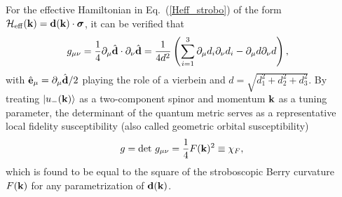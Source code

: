 \documentclass[aps,prb,twocolumn,superscriptaddress,groupedaddress]{revtex4}
\begin{document}
For the effective Hamiltonian in Eq.~(\ref{Heff_strobo}) of the form ${\cal H}_{\rm eff}({\bf k})={\bf d}({\bf k})\cdot{\boldsymbol\sigma}$, it can be verified that\cite{Panahiyan20}
\begin{eqnarray}
g_{\mu\nu}=\frac{1}{4}\partial_{\mu}\hat{\bf d}\cdot\partial_{\nu}\hat{\bf d}
=\frac{1}{4d^{2}}\left(\sum_{i=1}^{3}\partial_{\mu}d_{i}\partial_{\nu}d_{i}-\partial_{\mu}d \partial_{\nu} d \right),\;\;\;
\end{eqnarray}
with ${\hat{\bf e}}_{\mu}=\partial_{\mu}\hat{\bf d}/2$ playing the role of a vierbein and $d=\sqrt{d_1^2+d_2^2+d_3^2}$.
By treating $|u_{-}({\bf k})\rangle$ as a two-component spinor and momentum ${\bf k}$ as a tuning parameter, the determinant of the quantum metric serves as a representative local fidelity susceptibility\cite{You07,Zanardi07,Gu08,Gu10,Kolodrubetz17} (also called geometric orbital susceptibility\cite{Piechon16})
%
\begin{eqnarray}
g=\det\,g_{\mu\nu}=\frac{1}{4}F({\bf k})^{2}\equiv\chi_{F}, 
\label{fidelity_sus_driven}
\end{eqnarray}
%
which is found to be equal to the square of the stroboscopic Berry curvature $F({\bf k})$ for any parametrization of ${\bf d}({\bf k})$\cite{Ma13,Ma14,Panahiyan20}. 

\end{document}
